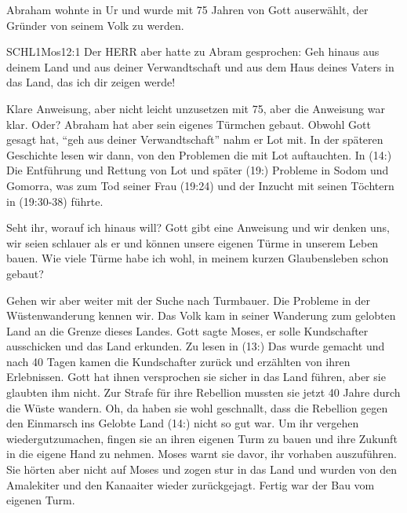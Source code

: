 \documentclass[12pt]{../../inc/mybib}
\newenvironment{block}[1][]{%
  \vspace{1.5em}%
  \noindent\textbf{#1}\par%
  \vspace{0.0em}%
}{%
  \vspace{1em}%
}
\begin{document}
\begin{block}
    Abraham wohnte in Ur und wurde mit 75 Jahren von Gott auserwählt, der Gründer von seinem Volk zu werden. 
    \begin{bibelbox}{SCHL}{1Mos}{12:1}
        Der HERR aber hatte zu Abram gesprochen: Geh hinaus aus deinem Land und aus deiner Verwandtschaft und aus dem Haus deines Vaters in das Land, das ich dir zeigen werde!
    \end{bibelbox} 

    Klare Anweisung, aber nicht leicht unzusetzen mit 75, aber die Anweisung war klar. Oder? Abraham hat aber sein eigenes Türmchen gebaut. Obwohl Gott gesagt hat, \enquote{geh aus deiner Verwandtschaft} nahm er Lot mit. In der späteren Geschichte lesen wir dann, von den Problemen die mit Lot auftauchten. In (14:) Die Entführung und Rettung von Lot und später (19:) Probleme in Sodom und Gomorra, was zum Tod seiner Frau (19:24) und der Inzucht mit seinen Töchtern in (19:30-38) führte.
\end{block}
\begin{block}
    Seht ihr, worauf ich hinaus will? Gott gibt eine Anweisung und wir denken uns, wir seien schlauer als er und können unsere eigenen Türme in unserem Leben bauen. Wie viele Türme habe ich wohl, in meinem kurzen Glaubensleben schon gebaut?
\end{block}
\begin{block}
    Gehen wir aber weiter mit der Suche nach Turmbauer. Die Probleme in der Wüstenwanderung kennen wir. Das Volk kam in seiner Wanderung zum gelobten Land an die Grenze dieses Landes. Gott sagte Moses, er solle Kundschafter ausschicken und das Land erkunden. Zu lesen in (13:) Das wurde gemacht und nach 40 Tagen kamen die Kundschafter zurück und erzählten von ihren Erlebnissen. Gott hat ihnen versprochen sie sicher in das Land führen, aber sie glaubten ihm nicht. Zur Strafe für ihre Rebellion mussten sie jetzt 40 Jahre durch die Wüste wandern. Oh, da haben sie wohl geschnallt, dass die Rebellion gegen den Einmarsch ins Gelobte Land (14:) nicht so gut war. Um ihr vergehen wiedergutzumachen, fingen sie an ihren eigenen Turm zu bauen und ihre Zukunft in die eigene Hand zu nehmen. Moses warnt sie davor, ihr vorhaben auszuführen. Sie hörten aber nicht auf Moses und zogen stur in das Land und wurden von den Amalekiter und den Kanaaiter wieder zurückgejagt. Fertig war der Bau vom eigenen Turm.
\end{block}
\end{document}
